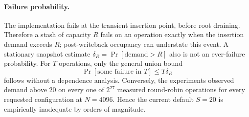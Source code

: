 \documentclass[11pt]{article}
\begin{document}
\paragraph{Failure probability.}
The implementation fails at the transient insertion point, before root
draining.  Therefore a stash of capacity $R$ fails on an operation exactly
when the insertion demand exceeds $R$; post-writeback occupancy can understate
this event.  A stationary snapshot estimate
$\delta_R=\Pr[\text{demand}>R]$ also is not an ever-failure probability.  For
$T$ operations, only the general union bound
\[
  \Pr[\text{some failure in }T]\leq T\delta_R
\]
follows without a dependence analysis.  Conversely, the experiments observed
demand above $20$ on every one of $2^{27}$ measured round-robin operations for
every requested configuration at $N=4096$.  Hence the current default
$S=20$ is empirically inadequate by orders of magnitude.
\end{document}
